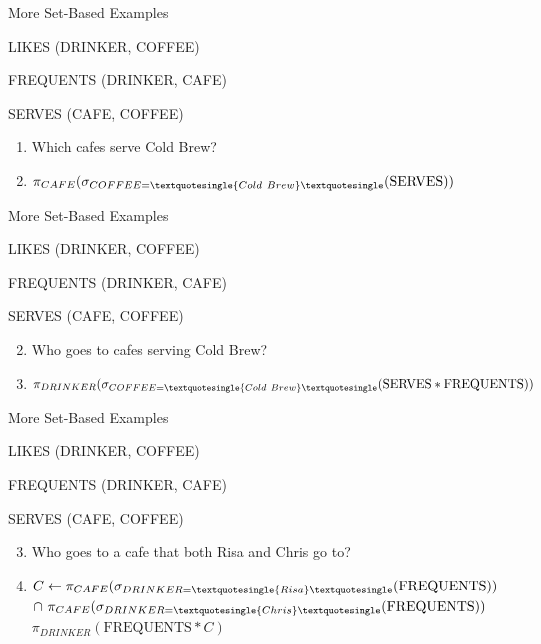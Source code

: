 \documentclass[aspectratio=169]{beamer}
\newcommand{\FREQUENTS}{\textrm{FREQUENTS}}
\newcommand{\SERVES}{\textrm{SERVES}}
\begin{document}
\begin{frame}{More Set-Based Examples}

LIKES (DRINKER, COFFEE)

FREQUENTS (DRINKER, CAFE)

SERVES (CAFE, COFFEE)
\begin{enumerate}
\item Which cafes serve Cold Brew?
\item[] $\pi_{CAFE}(\sigma_{COFFEE = \textquotesingle{Cold\ Brew}\textquotesingle}(\SERVES))$
\end{enumerate}
\end{frame}

\begin{frame}{More Set-Based Examples}

LIKES (DRINKER, COFFEE)

FREQUENTS (DRINKER, CAFE)

SERVES (CAFE, COFFEE)
\begin{enumerate}
\setcounter{enumi}{1}
\item Who goes to cafes serving Cold Brew?
\item[] $\pi_{DRINKER}(\sigma_{COFFEE = \textquotesingle{Cold\ Brew}\textquotesingle}(\SERVES * \FREQUENTS))$
\end{enumerate}
\end{frame}

\begin{frame}{More Set-Based Examples}

LIKES (DRINKER, COFFEE)

FREQUENTS (DRINKER, CAFE)

SERVES (CAFE, COFFEE)
\begin{enumerate}
\setcounter{enumi}{2}
\item Who goes to a cafe that both Risa and Chris go to?
\item[] $C \leftarrow \pi_{CAFE}(\sigma_{DRINKER=\textquotesingle{Risa}\textquotesingle}(\FREQUENTS))\ $\\
\hspace{2em}$\cap\ \pi_{CAFE}(\sigma_{DRINKER=\textquotesingle{Chris}\textquotesingle}(\FREQUENTS))$\\
$\pi_{DRINKER}(\FREQUENTS * C)$
\end{enumerate}
\end{frame}
\end{document}
